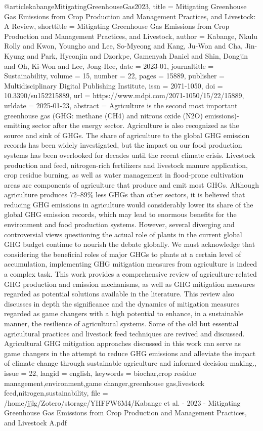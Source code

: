 {{{{@article{kabangeMitigatingGreenhouseGas2023,
  title = {Mitigating {{Greenhouse Gas Emissions}} from {{Crop Production}} and {{Management Practices}}, and {{Livestock}}: {{A Review}}},
  shorttitle = {Mitigating {{Greenhouse Gas Emissions}} from {{Crop Production}} and {{Management Practices}}, and {{Livestock}}},
  author = {Kabange, Nkulu Rolly and Kwon, Youngho and Lee, So-Myeong and Kang, Ju-Won and Cha, Jin-Kyung and Park, Hyeonjin and Dzorkpe, Gamenyah Daniel and Shin, Dongjin and Oh, Ki-Won and Lee, Jong-Hee},
  date = {2023-01},
  journaltitle = {Sustainability},
  volume = {15},
  number = {22},
  pages = {15889},
  publisher = {Multidisciplinary Digital Publishing Institute},
  issn = {2071-1050},
  doi = {10.3390/su152215889},
  url = {https://www.mdpi.com/2071-1050/15/22/15889},
  urldate = {2025-01-23},
  abstract = {Agriculture is the second most important greenhouse gas (GHG: methane (CH4) and nitrous oxide (N2O) emissions)-emitting sector after the energy sector. Agriculture is also recognized as the source and sink of GHGs. The share of agriculture to the global GHG emission records has been widely investigated, but the impact on our food production systems has been overlooked for decades until the recent climate crisis. Livestock production and feed, nitrogen-rich fertilizers and livestock manure application, crop residue burning, as well as water management in flood-prone cultivation areas are components of agriculture that produce and emit most GHGs. Although agriculture produces 72–89\% less GHGs than other sectors, it is believed that reducing GHG emissions in agriculture would considerably lower its share of the global GHG emission records, which may lead to enormous benefits for the environment and food production systems. However, several diverging and controversial views questioning the actual role of plants in the current global GHG budget continue to nourish the debate globally. We must acknowledge that considering the beneficial roles of major GHGs to plants at a certain level of accumulation, implementing GHG mitigation measures from agriculture is indeed a complex task. This work provides a comprehensive review of agriculture-related GHG production and emission mechanisms, as well as GHG mitigation measures regarded as potential solutions available in the literature. This review also discusses in depth the significance and the dynamics of mitigation measures regarded as game changers with a high potential to enhance, in a sustainable manner, the resilience of agricultural systems. Some of the old but essential agricultural practices and livestock feed techniques are revived and discussed. Agricultural GHG mitigation approaches discussed in this work can serve as game changers in the attempt to reduce GHG emissions and alleviate the impact of climate change through sustainable agriculture and informed decision-making.},
  issue = {22},
  langid = {english},
  keywords = {biochar,crop residue management,environment,game changer,greenhouse gas,livestock feed,nitrogen,sustainability},
  file = {/home/jjlg/Zotero/storage/YHFFW6M4/Kabange et al. - 2023 - Mitigating Greenhouse Gas Emissions from Crop Production and Management Practices, and Livestock A.pdf}
}

}}}}
